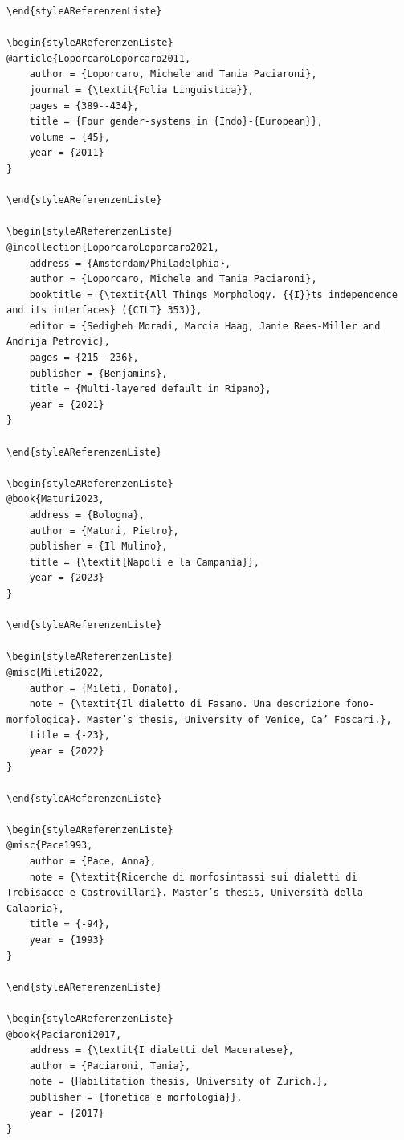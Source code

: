 \documentclass[output=paper]{langscibook}
\begin{document}
\begin{styleBiblio}
\begin{verbatim}
\end{styleAReferenzenListe}

\begin{styleAReferenzenListe}
@article{LoporcaroLoporcaro2011,
	author = {Loporcaro, Michele and Tania Paciaroni},
	journal = {\textit{Folia Linguistica}},
	pages = {389--434},
	title = {Four gender-systems in {Indo}-{European}},
	volume = {45},
	year = {2011}
}

\end{styleAReferenzenListe}

\begin{styleAReferenzenListe}
@incollection{LoporcaroLoporcaro2021,
	address = {Amsterdam/Philadelphia},
	author = {Loporcaro, Michele and Tania Paciaroni},
	booktitle = {\textit{All Things Morphology. {{I}}ts independence and its interfaces} ({CILT} 353)},
	editor = {Sedigheh Moradi, Marcia Haag, Janie Rees-Miller and Andrija Petrovic},
	pages = {215--236},
	publisher = {Benjamins},
	title = {Multi-layered default in Ripano},
	year = {2021}
}

\end{styleAReferenzenListe}

\begin{styleAReferenzenListe}
@book{Maturi2023,
	address = {Bologna},
	author = {Maturi, Pietro},
	publisher = {Il Mulino},
	title = {\textit{Napoli e la Campania}},
	year = {2023}
}

\end{styleAReferenzenListe}

\begin{styleAReferenzenListe}
@misc{Mileti2022,
	author = {Mileti, Donato},
	note = {\textit{Il dialetto di Fasano. Una descrizione fono-morfologica}. Master’s thesis, University of Venice, Ca’ Foscari.},
	title = {-23},
	year = {2022}
}

\end{styleAReferenzenListe}

\begin{styleAReferenzenListe}
@misc{Pace1993,
	author = {Pace, Anna},
	note = {\textit{Ricerche di morfosintassi sui dialetti di Trebisacce e Castrovillari}. Master’s thesis, Università della Calabria},
	title = {-94},
	year = {1993}
}

\end{styleAReferenzenListe}

\begin{styleAReferenzenListe}
@book{Paciaroni2017,
	address = {\textit{I dialetti del Maceratese},
	author = {Paciaroni, Tania},
	note = {Habilitation thesis, University of Zurich.},
	publisher = {fonetica e morfologia}},
	year = {2017}
}


\end{verbatim}
\end{styleBiblio}
\end{document}
